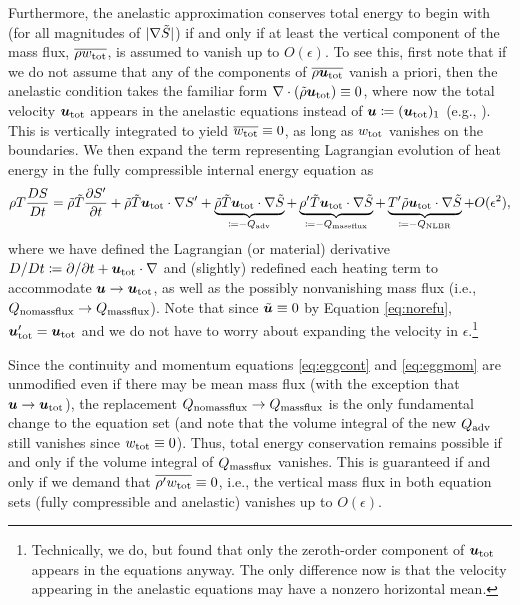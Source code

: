 \documentclass[12pt]{article}
\newcommand{\heatnlbr}{Q_{\rm NLBR}}
\newcommand{\heatnomassflux}{Q_{\rm nomassflux}}
\newcommand{\heatmassflux}{Q_{\rm massflux}}
\newcommand{\heatadv}{Q_{\rm adv}}
\newcommand{\utot}{{\vecu}_{\rm tot}}
\newcommand{\utotprime}{{\vecu}_{\rm tot}^\prime}
\newcommand{\utotone}{({\vecu}_{\rm tot})_1}
\newcommand{\utotgrad}{\utot\dotgrad}
\newcommand{\uwtot}{w_{\rm tot}}
\begin{document}
Furthermore, the anelastic approximation conserves total energy to begin with (for all magnitudes of $|\nabla\tilde{S}|$) if and only if at least the vertical component of the mass flux, $\overline{\rho \uwtot}$, is assumed to vanish up to $O(\epsilon)$. To see this, first note that if we do not assume that any of the components of $\overline{\rho \utot}$ vanish a priori, then the anelastic condition takes the familiar form $\nabla\cdot(\rhotilde\utot)\equiv0$, where now the total velocity $\utot$ appears in the anelastic equations instead of $\vecu\define\utotone$ (e.g., \citealt{Ogura1962}). This is vertically integrated to yield $\overline{\uwtot}\equiv0$, as long as $\uwtot$ vanishes on the boundaries. We then expand the term representing Lagrangian evolution of heat energy in the fully compressible internal energy equation as
\begin{align}\label{eq:enlhsfirstorder}
	\rho T\frac{DS}{Dt} =\rhotilde\tmptilde\pderiv{\entrprime}{t}  + \rhotilde\tmptilde\utotgrad \entrprime + \underbrace{\rhotilde\tmptilde \utotgrad \entrtilde}_{\define-\heatadv}+ \underbrace{ \rhoprime\tmptilde \utotgrad\entrtilde }_{\define- \heatmassflux} + \underbrace{ \tmpprime\rhotilde \utotgrad\entrtilde }_{\define- \heatnlbr} + O(\epsilon^2),
\end{align}
where we have defined the Lagrangian (or material) derivative $D/Dt\define \pderivline{}{t} + \utot\dotgrad$ and (slightly) redefined each heating term to accommodate $\vecu\rightarrow\utot$, as well as the possibly nonvanishing mass flux (i.e., $\heatnomassflux\rightarrow\heatmassflux$). Note that since $\tilde{\bm{u}}\equiv0$ by Equation \eqref{eq:norefu}, $\utotprime=\utot$ and we do not have to worry about expanding the velocity in $\epsilon$.\footnote{Technically, we do, but \citet{Ogura1962} found that only the zeroth-order component of $\utot$ appears in the equations anyway. The only difference now is that the velocity appearing in the anelastic equations may have a nonzero horizontal mean. }

Since the continuity and momentum equations \eqref{eq:eggcont} and \eqref{eq:eggmom} are unmodified even if there may be mean mass flux (with the exception that $\vecu\rightarrow\utot$), the replacement $\heatnomassflux\rightarrow\heatmassflux$ is the only fundamental change to the equation set (and note that the volume integral of the new $\heatadv$ still vanishes since $\uwtot\equiv0$). Thus, total energy conservation remains possible if and only if the volume integral of $\heatmassflux$ vanishes. This is guaranteed if and only if we demand that $\overline{\rho^\prime \uwtot}\equiv0$, i.e., the vertical mass flux in both equation sets (fully compressible and anelastic) vanishes up to $O(\epsilon)$.
\end{document}
